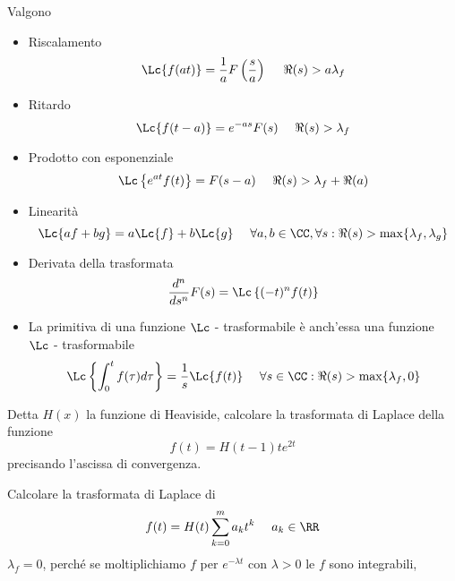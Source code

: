\begin{thm}
[Proprietà] Valgono
\begin{itemize}
\item Riscalamento
\begin{equation*}
\Lc\{f(at)\} = \frac{1}{a} F\left(\frac{s}{a}\right) \ \ \ \ \Re (s) > a\lambda_{f}
\end{equation*}
\item Ritardo
\begin{equation*}
\Lc\{f(t - a)\} = e^{- as} F(s) \ \ \ \ \Re (s) > \lambda_{f}
\end{equation*}
\item Prodotto con esponenziale
\begin{equation*}
\Lc\left\{e^{at} f(t)\right\} = F(s - a) \ \ \ \ \Re (s) > \lambda_{f} + \Re (a)
\end{equation*}
\item Linearità
\begin{equation*}
\Lc\{af + bg\} = a\Lc\{f\} + b\Lc\{g\} \ \ \ \ \forall a, b\in \CC, \forall s:\Re (s) > \max\{\lambda_{f}, \lambda_{g}\}
\end{equation*}
\item Derivata della trasformata
\begin{equation*}
\frac{d^{n}}{ds^{n}} F(s) = \Lc\left\{(- t)^{n} f(t)\right\}
\end{equation*}
\item La primitiva di una funzione $\Lc$ - trasformabile è anch'essa una funzione $\Lc$ - trasformabile
\begin{equation*}
\Lc\left\{\int^{t}_{0} f(\tau) d\tau \right\} = \frac{1}{s}\Lc\{f(t)\} \ \ \ \ \forall s\in \CC :\Re (s) > \max\{\lambda_{f}, 0\}
\end{equation*}
\end{itemize}
\end{thm}
Detta $\displaystyle H(x)$ la funzione di Heaviside, calcolare la trasformata di Laplace della funzione
\begin{equation*}
f(t) = H(t - 1) te^{2t}
\end{equation*}
precisando l'ascissa di convergenza.

\Esercizio{}

Calcolare la trasformata di Laplace di
\begin{equation*}
f(t) = H(t)\sum^{m}_{k = 0} a_{k} t^{k} \ \ \ \ a_{k} \in \RR
\end{equation*}
$\displaystyle \lambda_{f} = 0$, perché se moltiplichiamo $\displaystyle f$ per $\displaystyle e^{- \lambda t}$ con $\displaystyle \lambda > 0$ le $\displaystyle f$ sono integrabili,

